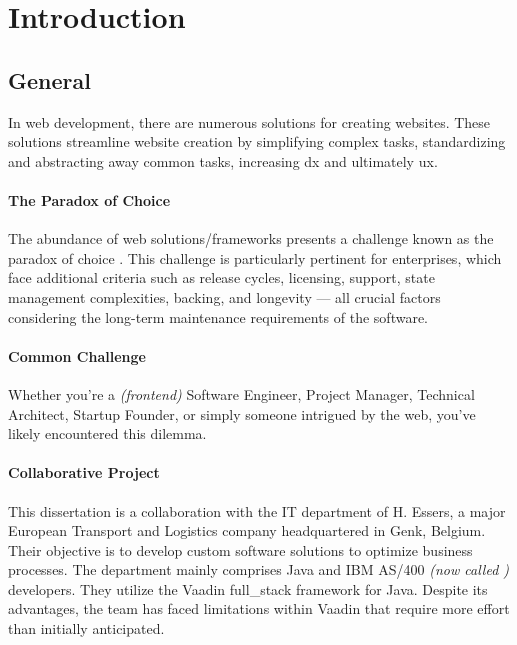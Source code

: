 \chapter{Introduction}

\section{General}
In web development, there are numerous solutions for creating websites. These solutions streamline website creation by simplifying complex tasks, standardizing and abstracting away common tasks, increasing \acrshort{dx} and ultimately \acrshort{ux}.

\subsubsection{The Paradox of Choice}
The abundance of web solutions/frameworks presents a challenge known as the paradox of choice \cite{the_decision_lab:paradox_of_choice}. This challenge is particularly pertinent for enterprises, which face additional criteria such as release cycles, licensing, support, state management complexities, backing, and longevity — all crucial factors considering the long-term maintenance requirements of the software.

\subsubsection{Common Challenge}

Whether you're a \textit{(frontend)} Software Engineer, Project Manager, Technical Architect, Startup Founder, or simply someone intrigued by the web, you've likely encountered this dilemma.

\subsubsection{Collaborative Project}

This dissertation is a collaboration with the IT department of H. Essers, a major European Transport and Logistics company headquartered in Genk, Belgium. Their objective is to develop custom software solutions to optimize business processes. The department mainly comprises Java and IBM AS/400 \textit{(now called  \cite{enwiki:ibm_i})} developers. They utilize the Vaadin \gls{full_stack} framework for Java. Despite its advantages, the team has faced limitations within Vaadin that require more effort than initially anticipated.


